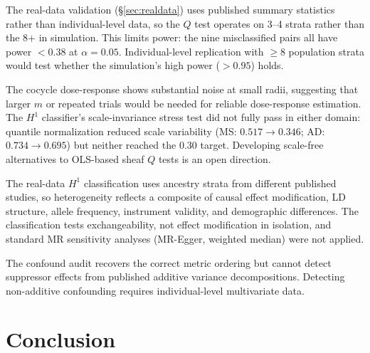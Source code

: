 \documentclass{article}
\begin{document}
The real-data validation (\S\ref{sec:realdata}) uses published summary statistics rather than individual-level data, so the $Q$ test operates on 3--4 strata rather than the 8+ in simulation.
This limits power: the nine misclassified pairs all have power $< 0.38$ at $\alpha = 0.05$.
Individual-level replication with $\geq 8$ population strata would test whether the simulation's high power ($> 0.95$) holds.

The cocycle dose-response shows substantial noise at small radii, suggesting that larger $m$ or repeated trials would be needed for reliable dose-response estimation.
The $H^1$ classifier's scale-invariance stress test did not fully pass in either domain: quantile normalization reduced scale variability (MS: $0.517 \to 0.346$; AD: $0.734 \to 0.695$) but neither reached the $0.30$ target.
Developing scale-free alternatives to OLS-based sheaf $Q$ tests is an open direction.

The real-data $H^1$ classification uses ancestry strata from different published studies, so heterogeneity reflects a composite of causal effect modification, LD structure, allele frequency, instrument validity, and demographic differences.
The classification tests exchangeability, not effect modification in isolation, and standard MR sensitivity analyses (MR-Egger, weighted median) were not applied.

The confound audit recovers the correct metric ordering but cannot detect suppressor effects from published additive variance decompositions.
Detecting non-additive confounding requires individual-level multivariate data.

\section{Conclusion}
\label{sec:conclusion}
\end{document}
